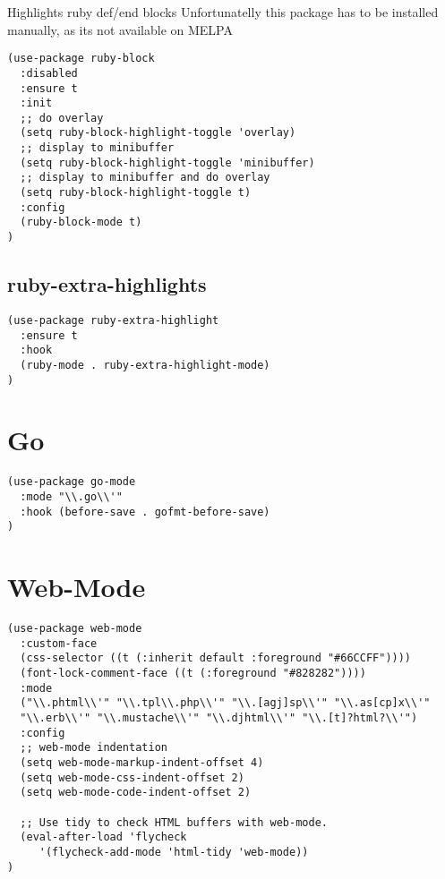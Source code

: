 \documentclass[11pt]{article}
\begin{document}
Highlights ruby def/end blocks
Unfortunatelly this package has to be installed manually, as its not available on MELPA

\begin{verbatim}
(use-package ruby-block
  :disabled
  :ensure t
  :init
  ;; do overlay
  (setq ruby-block-highlight-toggle 'overlay)
  ;; display to minibuffer
  (setq ruby-block-highlight-toggle 'minibuffer)
  ;; display to minibuffer and do overlay
  (setq ruby-block-highlight-toggle t)
  :config
  (ruby-block-mode t)
)
\end{verbatim}

\subsection*{ruby-extra-highlights}
\label{sec:orgf4d9566}

\begin{verbatim}
(use-package ruby-extra-highlight
  :ensure t
  :hook
  (ruby-mode . ruby-extra-highlight-mode)
)
\end{verbatim}


\section*{Go}
\label{sec:org8aaba47}

\begin{verbatim}
(use-package go-mode
  :mode "\\.go\\'"
  :hook (before-save . gofmt-before-save)
)
\end{verbatim}


\section*{Web-Mode}
\label{sec:org38d57da}
\begin{verbatim}
(use-package web-mode
  :custom-face
  (css-selector ((t (:inherit default :foreground "#66CCFF"))))
  (font-lock-comment-face ((t (:foreground "#828282"))))
  :mode
  ("\\.phtml\\'" "\\.tpl\\.php\\'" "\\.[agj]sp\\'" "\\.as[cp]x\\'"
  "\\.erb\\'" "\\.mustache\\'" "\\.djhtml\\'" "\\.[t]?html?\\'")
  :config
  ;; web-mode indentation
  (setq web-mode-markup-indent-offset 4)
  (setq web-mode-css-indent-offset 2)
  (setq web-mode-code-indent-offset 2)

  ;; Use tidy to check HTML buffers with web-mode.
  (eval-after-load 'flycheck
     '(flycheck-add-mode 'html-tidy 'web-mode))
)
\end{verbatim}
\end{document}
